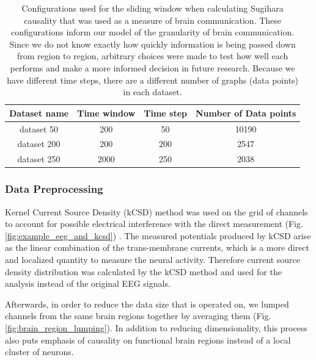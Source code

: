 \documentclass[journal,12pt,onecolumn,draftclsnofoot]{IEEEtran}  %
\begin{document}
\begin{table}[H]
\centering
\caption{Configurations used for the sliding window when calculating Sugihara causality that was used as a measure of brain communication. These configurations inform our model of the granularity of brain communication. Since we do not know exactly how quickly information is being passed down from region to region, arbitrary choices were made to test how well each performs and make a more informed decision in future research. Because we have different time steps, there are a different number of graphs (data points) in each dataset.}
\label{tab:sliding_window_configuration}
\begin{tabular}{|c|c|c|c|}
\hline
 Dataset name &  Time window &  Time step & Number of Data points\\ \hline
 
 dataset 50 & 200 & 50 & 10190 \\ \hline
 dataset 200 & 200 & 200 & 2547 \\ \hline
 dataset 250 & 2000 & 250 &  2038 \\ \hline
\end{tabular}
\end{table}

\subsubsection{Data Preprocessing}
Kernel Current Source Density (kCSD) method was used on the grid of channels to account for possible electrical interference with the direct measurement (Fig. \ref{fig:example_eeg_and_kcsd}) \cite{Potworowski2012}. The measured potentials produced by kCSD arise as the linear combination of the trans-membrane currents, which is a more direct and localized quantity to measure the neural activity. Therefore current source density distribution was calculated by the kCSD method and used for the analysis instead of the original EEG signals.

Afterwards, in order to reduce the data size that is operated on, we lumped channels from the same brain regions together by averaging them (Fig. \ref{fig:brain_region_lumping}). In addition to reducing dimensionality, this process also puts emphasis of causality on functional brain regions instead of a local cluster of neurons. 
\end{document}
